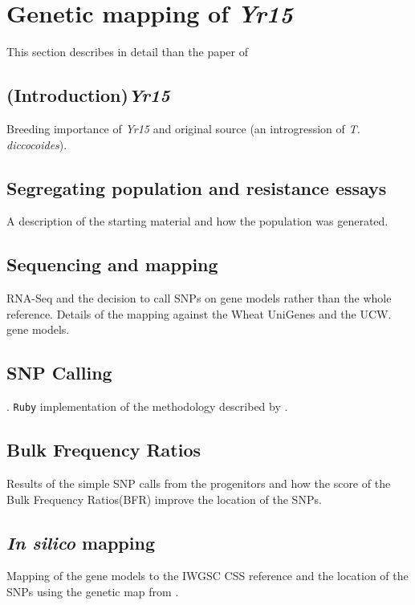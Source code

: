 
\chapter{Genetic mapping of \textit{Yr15}}

This section describes in detail than the paper of \citet{Ramirez-Gonzalez-2014}


\section{(Introduction)\textit{Yr15}} 
Breeding importance of \textit{Yr15} and original source (an introgression of \textit{T. diccocoides}). 

\section{Segregating population and resistance essays}
A description of the starting material and how the population was generated.  

\section{Sequencing and mapping} 

RNA-Seq and the decision to call SNPs on gene models rather than the whole reference.  Details of the mapping against the Wheat UniGenes \cite{PontiusJUWagnerL2002} and the UCW. \cite{Krasileva2013} gene models.  

\section{SNP Calling}. 
\verb|Ruby| implementation of the methodology described by \citet{Trick2012}. 

\section{Bulk Frequency Ratios} 
Results of the simple SNP calls from the progenitors and how the score of the Bulk Frequency Ratios(BFR) improve the location of the SNPs. 

\section{\textit{In silico} mapping}
Mapping of the gene models to the IWGSC CSS \cite{Mayer2014} reference and the location of the SNPs using the genetic map from \citet{Wang2014}.

